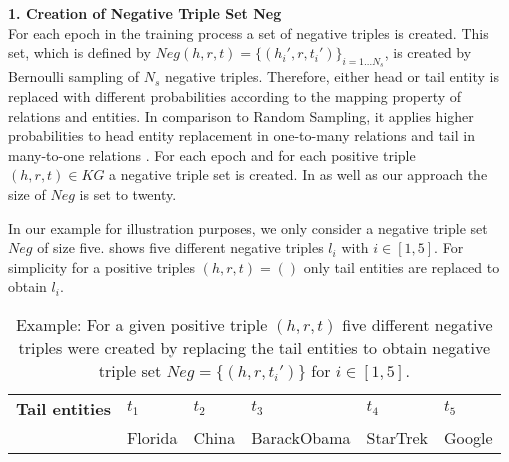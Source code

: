 \textbf{1. Creation of Negative Triple Set Neg}\\
For each epoch in the training process a set of negative triples is created.
This set, which is defined by $Neg(h,r,t)=\{(h_i',r,t_i')\}_{i=1\dots N_s}$, is created by Bernoulli sampling of $N_s$ negative triples.
Therefore, either head or tail entity is replaced with different probabilities according to the mapping property of relations and entities.
In comparison to Random Sampling, it applies higher probabilities to head entity replacement in one-to-many relations and tail in many-to-one relations \cite{qiannegative}.
For each epoch and for each positive triple $(h,r,t) \in KG$ a negative triple set is created.
In \kbgan as well as our approach the size of $Neg$ is set to twenty.

In our example for illustration purposes, we only consider a negative triple set $Neg$ of size five.
 shows five different negative triples $l_i$ with $i \in [1,5]$.
For simplicity for a positive triples $(h,r,t) = (\text{})$
only tail entities are replaced to obtain $l_i$. 
\begin{table}[h]
    \centering
    \begin{tabular}{llllll}
        \toprule
        
        \textbf{Tail entities}
        & \textbf{$t_1$} & \textbf{$t_2$} & \textbf{$t_3$} & \textbf{$t_4$} & \textbf{$t_5$} \\
         
        & Florida
        & China
        & BarackObama
        & StarTrek
        & Google  \\

        \bottomrule
    \end{tabular}
    \caption{Example: For a given positive triple $(h,r,t)$ five different negative triples were created by replacing the tail entities to obtain negative triple set 
    $Neg = \{(h,r,t_i')\}$ for $i \in [1,5]$.}
\label{tab:neg_example}
\end{table}